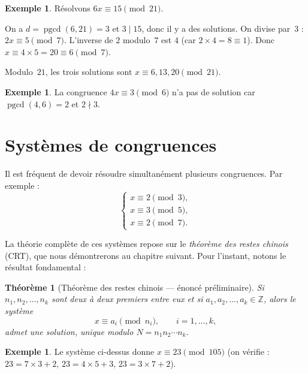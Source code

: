 \documentclass[12pt,a4paper,openany]{book}
\theoremstyle{definition}
\newtheorem{exemple}[definition]{Exemple}
\theoremstyle{plain}
\newtheorem{theoreme}[definition]{Théorème}
\theoremstyle{remark}
\newcommand{\Z}{\mathbb{Z}}
\DeclareMathOperator{\pgcd}{pgcd}
\begin{document}
\begin{exemple}
\label{ex:cong-lin-1}
Résolvons $6x \equiv 15 \pmod{21}$.

On a $d = \pgcd(6, 21) = 3$ et $3 \mid 15$, donc il y a des solutions.
On divise par~$3$ : $2x \equiv 5 \pmod{7}$. L'inverse de $2$ modulo~$7$ est $4$
(car $2 \times 4 = 8 \equiv 1$). Donc $x \equiv 4 \times 5 = 20 \equiv 6 \pmod{7}$.

Modulo~$21$, les trois solutions sont $x \equiv 6, 13, 20 \pmod{21}$.
\end{exemple}

\begin{exemple}
\label{ex:cong-lin-sans-sol}
La congruence $4x \equiv 3 \pmod{6}$ n'a pas de solution car $\pgcd(4, 6) = 2$
et $2 \nmid 3$.
\end{exemple}

\section{Systèmes de congruences}
\label{sec:cong-systemes}

Il est fréquent de devoir résoudre simultanément plusieurs congruences. Par exemple :
\[
  \begin{cases}
    x \equiv 2 \pmod{3}, \\
    x \equiv 3 \pmod{5}, \\
    x \equiv 2 \pmod{7}.
  \end{cases}
\]

La théorie complète de ces systèmes repose sur le \emph{théorème des restes chinois}
(CRT), que nous démontrerons au chapitre suivant.
Pour l'instant, notons le résultat fondamental :

\begin{theoreme}[Théorème des restes chinois --- énoncé préliminaire]
\label{thm:CRT-apercu}
Si $n_1, n_2, \ldots, n_k$ sont deux à deux premiers entre eux et si
$a_1, a_2, \ldots, a_k \in \Z$, alors le système
\[
  x \equiv a_i \pmod{n_i}, \qquad i = 1, \ldots, k,
\]
admet une solution, unique modulo $N = n_1 n_2 \cdots n_k$.
\end{theoreme}

\begin{exemple}
\label{ex:CRT-apercu}
Le système ci-dessus donne $x \equiv 23 \pmod{105}$ (on vérifie : $23 = 7 \times 3 + 2$,
$23 = 4 \times 5 + 3$, $23 = 3 \times 7 + 2$).
\end{exemple}
\end{document}
